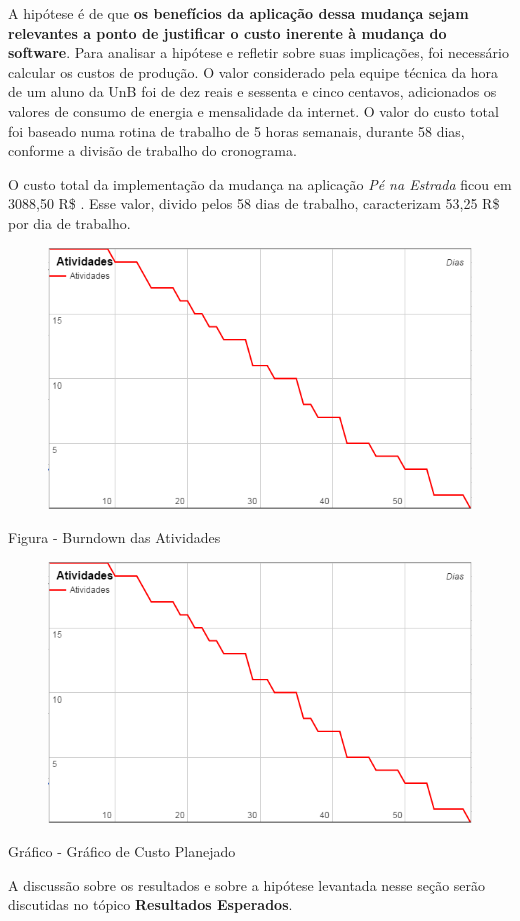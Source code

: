 A hipótese é de que \textbf{os benefícios da aplicação dessa mudança sejam relevantes a ponto de justificar o custo inerente à mudança do software}. Para analisar a hipótese e refletir sobre suas implicações, foi necessário calcular os custos de produção. O valor considerado pela equipe técnica da hora de um aluno da UnB foi de dez reais e sessenta e cinco centavos, adicionados os valores de consumo de energia e mensalidade da internet. O valor do custo total foi baseado numa rotina de trabalho de 5 horas semanais, durante 58 dias, conforme a divisão de trabalho do cronograma.

O custo total da implementação da mudança na aplicação \textit{Pé na Estrada} ficou em 3088,50 R\$ . Esse valor, divido pelos 58 dias de trabalho, caracterizam 53,25 R\$ por dia de trabalho.

\begin{figure}[h] 
	\centering %
	\includegraphics[scale=0.6]{Figuras/grafico_atividades.png} %

\end{figure}

Figura - Burndown das Atividades

\begin{figure}[h] 
	\centering %
	\includegraphics[scale=0.6]{Figuras/grafico_atividades.png} %
	
\end{figure}

Gráfico - Gráfico de Custo Planejado

A discussão sobre os resultados e sobre a hipótese levantada nesse seção serão discutidas no tópico \textbf{Resultados Esperados}. 